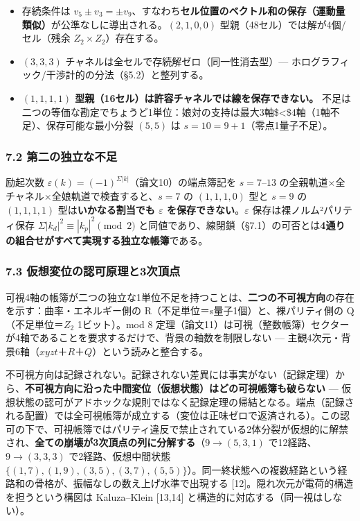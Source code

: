 \documentclass[
]{ltjsarticle}
\providecommand{\tightlist}{%
  \setlength{\itemsep}{0pt}\setlength{\parskip}{0pt}}
\begin{document}
\begin{itemize}
\tightlist
\item
  存続条件は
  \(v_5\pm v_3=\pm v_9\)、すなわち\textbf{セル位置のベクトル和の保存（運動量類似）}が公準なしに導出される。\((2,1,0,0)\)
  型親（48セル）では解が4個/セル（残余 \(Z_2\times Z_2\)）存在する。
\item
  \((3,3,3)\) チャネルは全セルで存続解ゼロ（同一性消去型）---
  ホログラフィック/干渉計的の分法（§5.2）と整列する。
\item
  \textbf{\((1,1,1,1)\)
  型親（16セル）は許容チャネルでは線を保存できない。}
  不足は二つの等価な勘定でちょうど1単位：娘対の支持は最大3軸\$\textless\$4軸（1軸不足）、保存可能な最小分裂
  \((5,5)\) は \(s=10=9+1\)（零点1量子不足）。
\end{itemize}

\subsubsection{7.2
第二の独立な不足}\label{ux7b2cux4e8cux306eux72ecux7acbux306aux4e0dux8db3}

励起次数 \(\varepsilon(k)=(-1)^{\Sigma|k|}\)（論文10）の端点簿記を
\(s=7\)--\(13\) の全親軌道×全チャネル×全娘軌道で検査すると、\(s=7\) の
\((1,1,1,0)\) 型と \(s=9\) の \((1,1,1,1)\) 型は\textbf{いかなる割当でも
\(\varepsilon\) を保存できない}。\(\varepsilon\)
保存は裸ノルム²パリティ保存 \(\Sigma|k_d|^2\equiv|k_p|^2\pmod2\)
と同値であり、線閉鎖（§7.1）の可否とは\textbf{4通りの組合せがすべて実現する独立な帳簿}である。

\subsubsection{7.3
仮想変位の認可原理と3次頂点}\label{ux4eeeux60f3ux5909ux4f4dux306eux8a8dux53efux539fux7406ux30683ux6b21ux9802ux70b9}

可視4軸の帳簿が二つの独立な1単位不足を持つことは、\textbf{二つの不可視方向}の存在を示す：曲率・エネルギー側の
R（不足単位＝s量子1個）と、裸パリティ側の Q（不足単位＝\(Z_2\)
1ビット）。mod 8
定理（論文11）は可視（整数帳簿）セクターが4軸であることを要求するだけで、背景の軸数を制限しない
--- 主観4次元・背景6軸（\(xyzt\)＋\(R\)＋\(Q\)）という読みと整合する。

不可視方向は記録されない。記録されない差異には事実がない（記録定理）から、\textbf{不可視方向に沿った中間変位（仮想状態）はどの可視帳簿も破らない}
---
仮想状態の認可がアドホックな規則ではなく記録定理の帰結となる。端点（記録される配置）では全可視帳簿が成立する（変位は正味ゼロで返済される）。この認可の下で、可視帳簿ではパリティ違反で禁止されている2体分裂が仮想的に解禁され、\textbf{全ての崩壊が3次頂点の列に分解する}（\(9\to(5,3,1)\)
で12経路、\(9\to(3,3,3)\) で2経路、仮想中間状態
\(\{(1,7),(1,9),(3,5),(3,7),(5,5)\}\)）。同一終状態への複数経路という経路和の骨格が、振幅なしの数え上げ水準で出現する
{[}12{]}。隠れ次元が電荷的構造を担うという構図は Kaluza--Klein
{[}13,14{]} と構造的に対応する（同一視はしない）。
\end{document}
